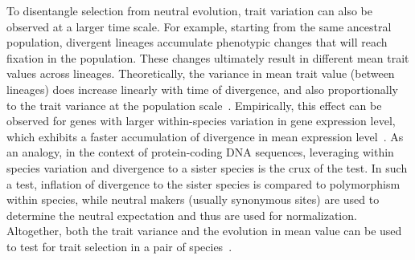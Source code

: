 \documentclass{article}
\begin{document}
To disentangle selection from neutral evolution, trait variation can also be observed at a larger time scale.
For example, starting from the same ancestral population, divergent lineages accumulate phenotypic changes that will reach fixation in the population.
These changes ultimately result in different mean trait values across lineages.
Theoretically, the variance in mean trait value (between lineages) does increase linearly with time of divergence, and also proportionally to the trait variance at the population scale~\citep{lande_genetic_1980, turelli_heritable_1984, felsenstein_phylogenies_1988a}.
Empirically, this effect can be observed for genes with larger within-species variation in gene expression level, which exhibits a faster accumulation of divergence in mean expression level~\citep{khaitovich_neutral_2004}.
As an analogy, in the context of protein-coding DNA sequences, leveraging within species variation and divergence to a sister species is the crux of the \citet{mcdonald_adaptative_1991} test.
In such a test, inflation of divergence to the sister species is compared to polymorphism within species, while neutral makers (usually synonymous sites) are used to determine the neutral expectation and thus are used for normalization.
Altogether, both the trait variance and the evolution in mean value can be used to test for trait selection in a pair of species~\citep{walsh_evolution_2018}.
\end{document}
